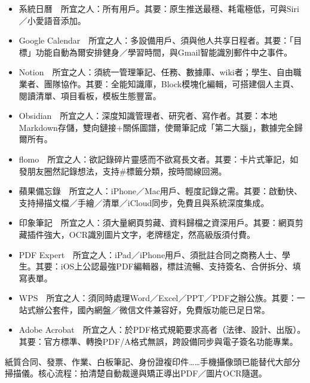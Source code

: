 
\begin{itemize}
  \item 系統日曆　所宜之人：所有用戶。其要：原生推送最穩、耗電極低，可與Siri／小愛語音添加。
  \item Google Calendar　所宜之人：多設備用戶、須與他人共享日程者。其要：「目標」功能自動為爾安排健身／學習時間，與Gmail智能識別郵件中之事件。
\end{itemize}


\begin{itemize}
  \item Notion　所宜之人：須統一管理筆記、任務、數據庫、wiki者；學生、自由職業者、團隊協作。其要：全能知識庫，Block模塊化編輯，可搭建個人主頁、閱讀清單、項目看板，模板生態豐富。
  \item Obsidian　所宜之人：深度知識管理者、研究者、寫作者。其要：本地Markdown存儲，雙向鏈接+關係圖譜，使爾筆記成「第二大腦」，數據完全歸爾所有。
  \item flomo　所宜之人：欲記錄碎片靈感而不欲寫長文者。其要：卡片式筆記，如發朋友圈然記錄想法，支持\#標籤分類，按時間線回溯。
  \item 蘋果備忘錄　所宜之人：iPhone／Mac用戶、輕度記錄之需。其要：啟動快、支持掃描文檔／手繪／清單／iCloud同步，免費且與系統深度集成。
  \item 印象筆記　所宜之人：須大量網頁剪藏、資料歸檔之資深用戶。其要：網頁剪藏插件強大，OCR識別圖片文字，老牌穩定，然高級版須付費。
\end{itemize}


\begin{itemize}
  \item PDF Expert　所宜之人：iPad／iPhone用戶、須批註合同之商務人士、學生。其要：iOS上公認最強PDF編輯器，標註流暢、支持簽名、合併拆分、填寫表單。
  \item WPS　所宜之人：須同時處理Word／Excel／PPT／PDF之辦公族。其要：一站式辦公套件，國內網盤／微信文件兼容好，免費版功能已足日常。
  \item Adobe Acrobat　所宜之人：於PDF格式規範要求高者（法律、設計、出版）。其要：官方標準、轉換PDF/A格式無誤，跨設備同步與電子簽名功能專業。
\end{itemize}


紙質合同、發票、作業、白板筆記、身份證複印件……手機攝像頭已能替代大部分掃描儀。核心流程：拍清楚自動裁邊與矯正導出PDF／圖片OCR隨選。

